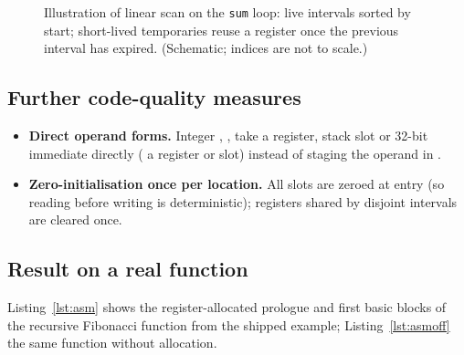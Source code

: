 \begin{figure}[H]\centering
{}
\caption{Illustration of linear scan on the \texttt{sum} loop: live intervals sorted by start; short-lived temporaries reuse a register once the previous interval has expired. (Schematic; indices are not to scale.)}
\end{figure}

\subsection{Further code-quality measures}
\begin{itemize}
  \item \textbf{Direct operand forms.} Integer , ,  take a register, stack slot or 32-bit immediate directly ( a register or slot) instead of staging the operand in .
  \item \textbf{Zero-initialisation once per location.} All slots are zeroed at entry (so reading before writing is deterministic); registers shared by disjoint intervals are cleared once.
\end{itemize}

\subsection{Result on a real function}
Listing~\ref{lst:asm} shows the register-allocated prologue and first basic blocks of the recursive Fibonacci function from the shipped example; Listing~\ref{lst:asmoff} the same function without allocation.

